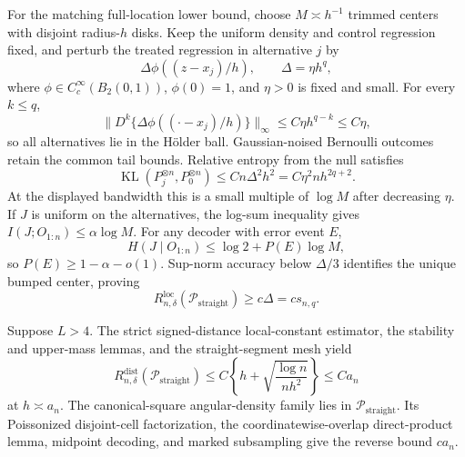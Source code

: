 For the matching full-location lower bound, choose \(M\asymp h^{-1}\) trimmed centers with disjoint radius-\(h\) disks.  Keep the uniform density and control regression fixed, and perturb the treated regression in alternative \(j\) by
\[
 \Delta\phi((z-x_j)/h),
 \qquad \Delta=\eta h^q,
\]
where \(\phi\in C_c^\infty(B_2(0,1))\), \(\phi(0)=1\), and \(\eta>0\) is fixed and small.  For every \(k\leq q\),
\[
 \lVert D^k\{\Delta\phi((\cdot-x_j)/h)\}\rVert_\infty
 \leq C\eta h^{q-k}\leq C\eta,
\]
so all alternatives lie in the H\"older ball.  Gaussian-noised Bernoulli outcomes retain the common tail bounds.  Relative entropy from the null satisfies
\[
 \operatorname{KL}(P_j^{\otimes n},P_0^{\otimes n})
 \leq Cn\Delta^2h^2=C\eta^2nh^{2q+2}.
\]
At the displayed bandwidth this is a small multiple of \(\log M\) after decreasing \(\eta\).  If \(J\) is uniform on the alternatives, the log-sum inequality gives \(I(J;O_{1:n})\leq\alpha\log M\).  For any decoder with error event \(E\),
\[
 H(J\mid O_{1:n})\leq\log2+P(E)\log M,
\]
so \(P(E)\geq1-\alpha-o(1)\).  Sup-norm accuracy below \(\Delta/3\) identifies the unique bumped center, proving
\[
 R_{n,\delta}^{\mathrm{loc}}(\mathcal P_{\mathrm{straight}})
 \geq c\Delta=cs_{n,q}.
\]

Suppose \(L>4\).  The strict signed-distance local-constant estimator, the stability and upper-mass lemmas, and the straight-segment mesh yield
\[
 R_{n,\delta}^{\mathrm{dist}}(\mathcal P_{\mathrm{straight}})
 \leq C\left\{h+\sqrt{\frac{\log n}{nh^2}}\right\}\leq Ca_n
\]
at \(h\asymp a_n\).  The canonical-square angular-density family lies in \(\mathcal P_{\mathrm{straight}}\).  Its Poissonized disjoint-cell factorization, the coordinatewise-overlap direct-product lemma, midpoint decoding, and marked subsampling give the reverse bound \(ca_n\).

